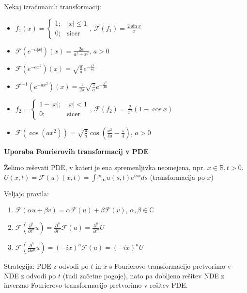 \documentclass[10pt,a4paper]{amsart}
\theoremstyle{definition} %
\theoremstyle{plain} %
\let\oldint\int
\renewcommand{\int}{\oldint \!}
\newcommand{\R}{\mathbb R}
\newcommand{\C}{\mathbb C}
\newcommand{\F}{\mathcal{F}}
\begin{document}
Nekaj izračunanih transformacij:
\begin{itemize}

\item $f_1(x) = \begin{cases} 1;& |x| \leq 1 \\ 0; &\text{sicer} \end{cases}$, $\F(f_1) = \frac{2\sin x}{x}$

\item $\F (e^{-a|x|})(x) = \frac{2a}{a^2+x^2}$, $a>0$

\item $\F (e^{-ax^2})(x) = \sqrt{\frac{\pi}{a}}e^{-\frac{x^2}{4a}}$

\item $\F^{-1} (e^{-ax^2})(x) = \frac{1}{2\pi}\sqrt{\frac{\pi}{a}}e^{-\frac{x^2}{4a}}$

\item $f_2 = \begin{cases} 1-|x|;& |x|< 1 \\  0; & \text{sicer} \end{cases}$, $\F(f_2) = \frac{2}{x^2}(1-\cos x)$

\item $\F (\cos (ax^2) ) = \sqrt{\frac{\pi}{a}} \cos (\frac{x^2}{4a}-\frac{ \pi}{4} )$, $a > 0$

\end{itemize}

\textbf{Uporaba Fourierovih transformacij v PDE}

Želimo reševati PDE, v kateri je ena spremenljivka neomejena, npr. $x \in \R, t
> 0$.  $U(x,t) =  \F(u)(x,t) = \int_{-\infty}^\infty u(s,t)e^{isx}ds$
(transformacija po $x$)

Veljajo pravila: \begin{enumerate}

\item $\F(\alpha u + \beta v) = \alpha \F(u) + \beta \F (v)$, $\alpha , \beta
  \in \C$

\item $\F(\frac{\partial^n}{\partial t^n} u) = \frac{\partial^n}{\partial
  t^n}\F(u) = \frac{\partial^n}{\partial t^n} U$

\item $\F(\frac{\partial^n}{\partial x^n}u) = (-ix)^n \F(u) = (-ix)^n U$

\end{enumerate}

Strategija: PDE z odvodi po $t$ in $x$ s Fourierovo transformacijo pretvorimo v
NDE z odvodi po $t$ (tudi začetne pogoje), nato pa dobljeno rešitev NDE z
inverzno Fourierovo transformacijo pretvorimo v rešitev PDE.
\end{document}
